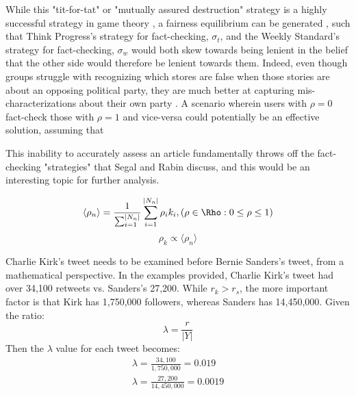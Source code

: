 While this "tit-for-tat" or "mutually assured destruction" strategy is a highly successful strategy in game theory \citep{segal2007tit}, a fairness equilibrium can be generated \citep{rabin1993incorporating}, such that Think Progress's strategy for fact-checking, $\sigma_t$, and the Weekly Standard's strategy for fact-checking, $\sigma_w$ would both skew towards being lenient in the belief that the other side would therefore be lenient towards them. Indeed, even though groups struggle with recognizing which stores are false when those stories are about an opposing political party, they are much better at capturing mis-characterizations about their own party \citep{pennycook2019lazy}. A scenario wherein users with $\rho = 0$ fact-check those with $\rho = 1$ and vice-versa could potentially be an effective solution, assuming that 

This inability to accurately assess an article fundamentally throws off the fact-checking "strategies" that Segal and Rabin discuss, and this would be an interesting topic for further analysis.





 \begin{equation}
    \label{ech chamber}
        \langle \rho_n \rangle = \frac{1}{\sum_{i=1}^{|N_n|}}\sum_{i=1}^{|N_n|}{\rho_i}{k_i}, (\rho \in \Rho: 0 \leq \rho \leq 1) 
 \end{equation}
 \begin{equation}
    \label{leaningproportionaltonetwork}
        \rho_k \propto \langle \rho_n \rangle
 \end{equation}
 
 
 
 
Charlie Kirk's tweet needs to be examined before Bernie Sanders's tweet, from a mathematical perspective. In the examples provided, Charlie Kirk's tweet had over 34,100 retweets vs. Sanders's 27,200. While $r_k > r_s$, the more important factor is that Kirk has 1,750,000 followers, whereas Sanders has 14,450,000. Given the ratio:
\begin{equation}
\label{retweetsperfollower}
    \lambda = \frac{r}{|Y|}
\end{equation}
Then the $\lambda$ value for each tweet becomes:
\begin{equation}
    \begin{split}
        \lambda = \frac{34,100}{1,750,000}=0.019 \\
        \lambda = \frac{27,200}{14,450,000}=0.0019
    \end{split}
\end{equation}

